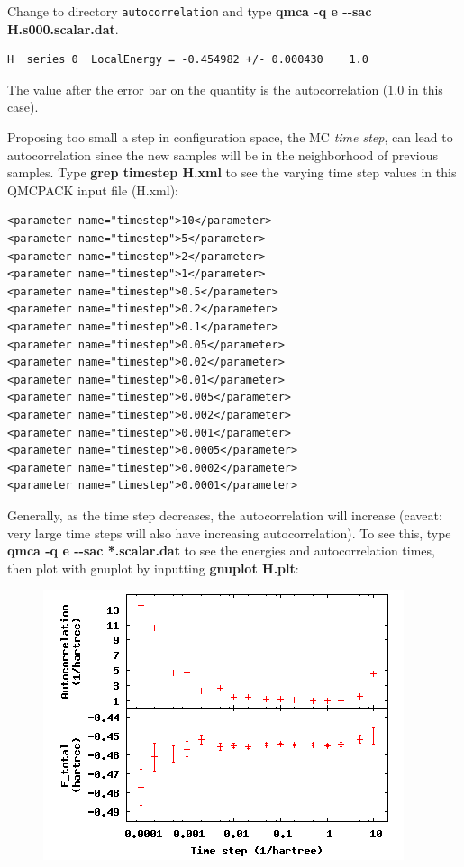 Change to directory \texttt{autocorrelation} and type \textbf{qmca -q e
{-}{-}sac H.s000.scalar.dat}.  

\begin{shaded} 
\begin{verbatim} 
H  series 0  LocalEnergy = -0.454982 +/- 0.000430    1.0 
\end{verbatim} 
\end{shaded}

The value after the error bar on the quantity is the autocorrelation (1.0 in
this case).

Proposing too small a step in configuration space, the MC \textit{time step},
can lead to autocorrelation since the new samples will be in the neighborhood
of previous samples.  Type \textbf{grep timestep H.xml} to see the varying time
step values in this QMCPACK input file (H.xml):

\begin{shaded} 
\begin{verbatim} 
<parameter name="timestep">10</parameter>
<parameter name="timestep">5</parameter> 
<parameter name="timestep">2</parameter> 
<parameter name="timestep">1</parameter>
<parameter name="timestep">0.5</parameter> 
<parameter name="timestep">0.2</parameter> 
<parameter name="timestep">0.1</parameter>
<parameter name="timestep">0.05</parameter> 
<parameter name="timestep">0.02</parameter> 
<parameter name="timestep">0.01</parameter>
<parameter name="timestep">0.005</parameter> 
<parameter name="timestep">0.002</parameter> 
<parameter name="timestep">0.001</parameter>
<parameter name="timestep">0.0005</parameter> 
<parameter name="timestep">0.0002</parameter> 
<parameter name="timestep">0.0001</parameter> 
\end{verbatim} 
\end{shaded}

Generally, as the time step decreases, the autocorrelation will increase
(caveat: very large time steps will also have increasing autocorrelation). To
see this, type \textbf{qmca -q e {-}{-}sac *.scalar.dat} to see the energies
and autocorrelation times, then plot with gnuplot by inputting \textbf{gnuplot
H.plt}:

\FloatBarrier
\begin{figure}[ht!]
\begin{center}
\includegraphics[trim = 0mm 0mm 0mm 0mm, clip,width=0.75\columnwidth]{./figures/lab_qmc_statistics_blocking1}
\end{center}
\end{figure}
\FloatBarrier

